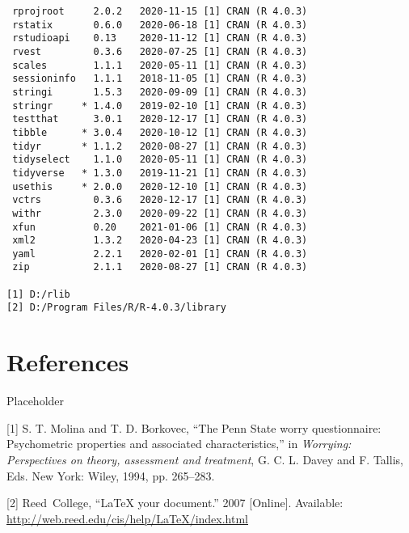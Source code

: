 \documentclass[twoside,12pt,final]{ucthesis-CA2012}
\begin{document}
\begin{ucmainmatter}
\begin{verbatim}
 rprojroot     2.0.2   2020-11-15 [1] CRAN (R 4.0.3)                       
 rstatix       0.6.0   2020-06-18 [1] CRAN (R 4.0.3)                       
 rstudioapi    0.13    2020-11-12 [1] CRAN (R 4.0.3)                       
 rvest         0.3.6   2020-07-25 [1] CRAN (R 4.0.3)                       
 scales        1.1.1   2020-05-11 [1] CRAN (R 4.0.3)                       
 sessioninfo   1.1.1   2018-11-05 [1] CRAN (R 4.0.3)                       
 stringi       1.5.3   2020-09-09 [1] CRAN (R 4.0.3)                       
 stringr     * 1.4.0   2019-02-10 [1] CRAN (R 4.0.3)                       
 testthat      3.0.1   2020-12-17 [1] CRAN (R 4.0.3)                       
 tibble      * 3.0.4   2020-10-12 [1] CRAN (R 4.0.3)                       
 tidyr       * 1.1.2   2020-08-27 [1] CRAN (R 4.0.3)                       
 tidyselect    1.1.0   2020-05-11 [1] CRAN (R 4.0.3)                       
 tidyverse   * 1.3.0   2019-11-21 [1] CRAN (R 4.0.3)                       
 usethis     * 2.0.0   2020-12-10 [1] CRAN (R 4.0.3)                       
 vctrs         0.3.6   2020-12-17 [1] CRAN (R 4.0.3)                       
 withr         2.3.0   2020-09-22 [1] CRAN (R 4.0.3)                       
 xfun          0.20    2021-01-06 [1] CRAN (R 4.0.3)                       
 xml2          1.3.2   2020-04-23 [1] CRAN (R 4.0.3)                       
 yaml          2.2.1   2020-02-01 [1] CRAN (R 4.0.3)                       
 zip           2.1.1   2020-08-27 [1] CRAN (R 4.0.3)                       

[1] D:/rlib
[2] D:/Program Files/R/R-4.0.3/library
\end{verbatim}
\hypertarget{references}{%
\chapter*{References}\label{references}}

Placeholder

\hypertarget{refs}{}
\leavevmode\hypertarget{ref-Molina1994}{}%
{[}1{]} S. T. Molina and T. D. Borkovec, ``The Penn State worry questionnaire: Psychometric properties and associated characteristics,'' in \emph{Worrying: Perspectives on theory, assessment and treatment}, G. C. L. Davey and F. Tallis, Eds. New York: Wiley, 1994, pp. 265--283.

\leavevmode\hypertarget{ref-reedweb2007}{}%
{[}2{]} Reed~College, ``LaTeX your document.'' 2007 {[}Online{]}. Available: \url{http://web.reed.edu/cis/help/LaTeX/index.html}

\end{ucmainmatter}
\end{document}
